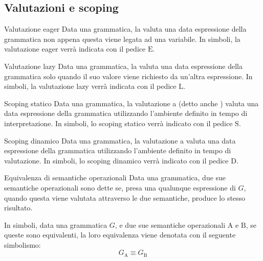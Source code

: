 \documentclass[a4paper, 12pt]{report}
\begin{document}
    \subsection{Valutazioni e scoping}

    \begin{frameddefn}{Valutazione eager}
        Data una grammatica, la  valuta una data espressione della grammatica non appena questa viene legata ad una variabile. In simboli, la valutazione eager verrà indicata con il pedice $\mathrm{E}$.
    \end{frameddefn}

    \begin{frameddefn}{Valutazione lazy}
        Data una grammatica, la  valuta una data espressione della grammatica solo quando il suo valore viene richiesto da un'altra espressione. In simboli, la valutazione lazy verrà indicata con il pedice $\mathrm{L}$.
    \end{frameddefn}

    \begin{frameddefn}{Scoping statico}
        Data una grammatica, la valutazione a  (detto anche ) valuta una data espressione della grammatica utilizzando l'ambiente definito in tempo di interpretazione. In simboli, lo scoping statico verrà indicato con il pedice $\mathrm{S}$.
    \end{frameddefn}

    \begin{frameddefn}{Scoping dinamico}
        Data una grammatica, la valutazione a  valuta una data espressione della grammatica utilizzando l'ambiente definito in tempo di valutazione. In simboli, lo scoping dinamico verrà indicato con il pedice $\mathrm{D}$.
    \end{frameddefn}

    \begin{frameddefn}[label={equiv lang}]{Equivalenza di semantiche operazionali}
        Data una grammatica, due sue semantiche operazionali sono dette  se, presa una qualunque espressione di $G$, quando questa viene valutata attraverso le due semantiche, produce lo stesso risultato.

        In simboli, data una grammatica $G$, e due sue semantiche operazionali $\mathrm{A}$ e $\mathrm{B}$, se queste sono equivalenti, la loro equivalenza viene denotata con il seguente simbolismo: $$G_\mathrm{A} \equiv G_\mathrm{B}$$
    \end{frameddefn}
\end{document}
